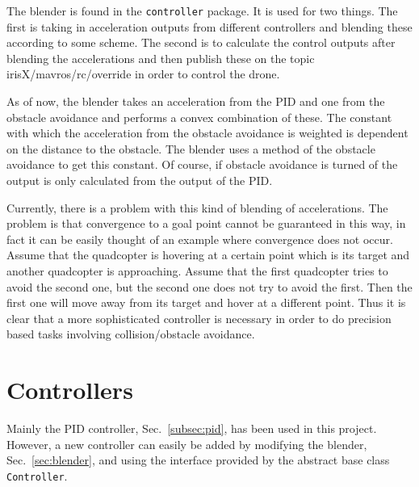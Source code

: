 \documentclass[titlepage,11pt,a4paper]{article}
\begin{document}
The blender is found in the \texttt{controller} package. It is used
for two things. The first is taking in acceleration outputs from
different controllers and blending these according to some scheme. The
second is to calculate the control outputs after blending the
accelerations and then publish these on the topic
irisX/mavros/rc/override in order to control the drone.

As of now, the blender takes an acceleration from the PID and one from
the obstacle avoidance and performs a convex combination of these. The
constant with which the acceleration from the obstacle avoidance is
weighted is dependent on the distance to the obstacle. The blender
uses a method of the obstacle avoidance to get this constant. Of
course, if obstacle avoidance is turned of the output is only
calculated from the output of the PID.

Currently, there is a problem with this kind of blending of
accelerations. The problem is that convergence to a goal point cannot
be guaranteed in this way, in fact it can be easily thought of an
example where convergence does not occur. Assume that the quadcopter
is hovering at a certain point which is its target and another
quadcopter is approaching. Assume that the first quadcopter tries to
avoid the second one, but the second one does not try to avoid the
first. Then the first one will move away from its target and hover at
a different point. Thus it is clear that a more sophisticated
controller is necessary in order to do precision based tasks involving
collision/obstacle avoidance.


\section{Controllers}
Mainly the PID controller, Sec.~\ref{subsec:pid}, has been used in
this project. However, a new controller can easily be added by
modifying the blender, Sec.~\ref{sec:blender}, and using the interface
provided by the abstract base class \texttt{Controller}.
\end{document}

